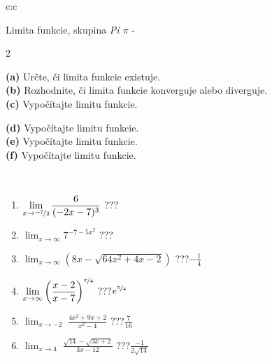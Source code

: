\documentclass[10pt]{report}
\begin{document}
\begin{tabular}{c:c}
\begin{minipage}[c][104.5mm][t]{0.5\linewidth}
\begin{center}
\vspace{7mm}
{\huge Limita funkcie, skupina \textit{Pi $\pi$} -}\\[5mm]
\begin{minipage}{0.95\linewidth}
\begin{center}
{\small \begin{multicols}{2} \raggedright
\textbf{(a)} Určte, či limita funkcie existuje. \\[1mm]
\textbf{(b)} Rozhodnite, či limita funkcie konverguje alebo diverguje. \\[1mm]
\textbf{(c)} Vypočítajte limitu funkcie. \par \columnbreak
\textbf{(d)} Vypočítajte limitu funkcie. \\[1mm]
\textbf{(e)} Vypočítajte limitu funkcie. \\[1mm]
\textbf{(f)} Vypočítajte limitu funkcie. \\[1mm]
\end{multicols}
}
\end{center}
\end{minipage}
\\[4mm]
\begin{minipage}{0.79\linewidth}
\begin{center}
\begin{varwidth}{\linewidth}
\begin{enumerate}
\normalsize
\item $\displaystyle\lim_{x\to\nicefrac{-7}{2}}{\frac{6}{(-2x-7)^{3}}}$\quad \dotfill\; ???\;\dotfill \quad {}
\item $\displaystyle\lim_{x\to\infty}{7^{-7-5x^2}}$\quad \dotfill\; ???\;\dotfill \quad {}
\item $\displaystyle\lim_{x\to\infty}{\left(8x - \sqrt{64x^2+4x-2}\right)}$\quad \dotfill\; ???\;\dotfill \quad $-\frac{1}{4}$
\item $\displaystyle\lim_{x\to\infty}{\left( \frac{x-2}{x-7} \right)^{\nicefrac{x}{4}}}$\quad \dotfill\; ???\;\dotfill \quad $e^{\nicefrac{5}{4}}$
\item $\displaystyle\lim_{x\to -2}{\;\frac{4x^2+9x+2}{x^2-4}}$\quad \dotfill\; ???\;\dotfill \quad $\frac{7}{16}$
\item $\displaystyle\lim_{x\to 4}{\;\frac{\sqrt{14}-\sqrt{3x+2}}{3x-12}}$\quad \dotfill\; ???\;\dotfill \quad $\frac{-1}{2\sqrt{14}}$

\end{enumerate}
\end{varwidth}
\end{center}
\end{minipage}
\end{center}
\end{minipage}
\end{tabular}
\end{document}

